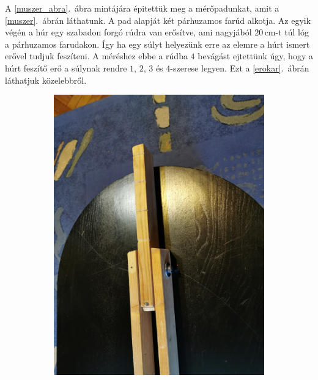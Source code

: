\documentclass[a4paper,12pt]{article}
\begin{document}
A \ref{muszer_abra}.\ ábra mintájára épitettük meg a mérőpadunkat, amit a \ref{muszer}.\ ábrán láthatunk. A pad alapját két párhuzamos farúd alkotja. Az egyik végén a húr egy szabadon forgó rúdra van erősítve, ami nagyjából $20$\,cm-t túl lóg a párhuzamos farudakon. Így ha egy súlyt helyezünk erre az elemre a húrt ismert erővel tudjuk feszíteni. A méréshez ebbe a rúdba $4$ bevágást ejtettünk úgy, hogy a húrt feszítő erő a súlynak rendre $1$, $2$, $3$ és $4$-szerese legyen. Ezt a \ref{erokar}.\ ábrán láthatjuk közelebbről.

\begin{figure}[h!]
\centering
\begin{subfigure}[t]{.4\linewidth}
\centering
\includegraphics[width=\linewidth]{elejesulynelkul.jpg}
\end{subfigure}%
~~
\begin{subfigure}[t]{.4\linewidth}

\end{subfigure}
\end{figure}
\end{document}
